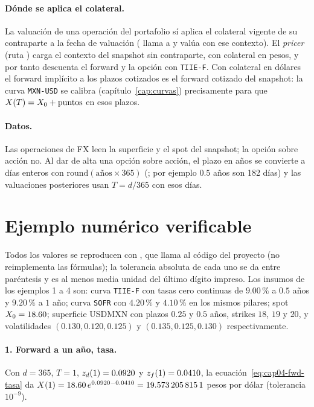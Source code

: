 \paragraph{Dónde se aplica el colateral.} La valuación de una operación del portafolio sí aplica el colateral
vigente de su contraparte a la fecha de valuación ( llama a
 y valúa con ese contexto). El \emph{pricer} (ruta
) carga el contexto del snapshot sin contraparte, con colateral en
pesos, y por tanto descuenta el forward y la opción con \texttt{TIIE-F}. Con colateral en dólares el forward
implícito a los plazos cotizados es el forward cotizado del snapshot: la curva \texttt{MXN-USD} se calibra
(capítulo~\ref{cap:curvas}) precisamente para que $\FxF{T}=\Spot+\text{puntos}$ en esos plazos.

\paragraph{Datos.} Las operaciones de FX leen la superficie y el spot del snapshot; la opción sobre acción no.
Al dar de alta una opción sobre acción, el plazo en años se convierte a días enteros con
$\mathrm{round}(\text{años}\times365)$ (; por ejemplo $0.5$ años son
182 días) y las valuaciones posteriores usan $T=d/365$ con esos días.

\section{Ejemplo numérico verificable}\label{sec:cap04-ejemplo}

Todos los valores se reproducen con , que llama al código
del proyecto (no reimplementa las fórmulas); la tolerancia absoluta de cada uno se da entre paréntesis y es
al menos media unidad del último dígito impreso. Los insumos de los ejemplos 1 a 4 son: curva
\texttt{TIIE-F} con tasas cero continuas de $9.00\,\%$ a $0.5$ años y $9.20\,\%$ a $1$ año; curva
\texttt{SOFR} con $4.20\,\%$ y $4.10\,\%$ en los mismos pilares; spot $\Spot=18.60$; superficie USDMXN con
plazos $0.25$ y $0.5$ años, strikes $18$, $19$ y $20$, y volatilidades $(0.130, 0.120, 0.125)$ y
$(0.135, 0.125, 0.130)$ respectivamente.

\paragraph{1. Forward a un año, tasa.} Con $d=365$, $T=1$, $\zr{d}{1}=0.0920$ y $\zr{f}{1}=0.0410$, la
ecuación~\eqref{eq:cap04-fwd-tasa} da $\FxF{1}=18.60\,e^{0.0920-0.0410}=\verif{cap04-fwd-1a}{19.5732058151}$
pesos por dólar (tolerancia $10^{-9}$).

